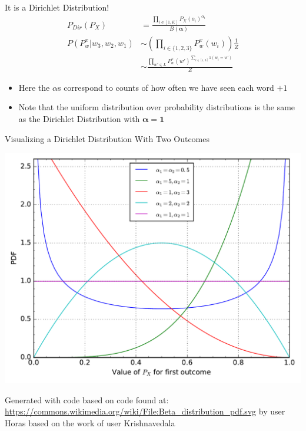 \documentclass[11pt]{beamer}
\begin{document}
	\begin{frame}{It is a Dirichlet Distribution!}
		\begin{align*}
			P_{Dir}(P_X) & = \frac{\prod_{i \in [1,K]} P_{X}(o_i)^{\alpha_i}}{B(\boldsymbol{\alpha})} \\
			P(P_{w}^x \vert w_3,w_2,w_1) & \sim \left(\prod_{i \in \{1,2,3\}} P_{w}^{x}(w_i)\right) \frac{1}{Z} \\
			& \sim \frac{\prod_{w' \in L} P_{w}^{x}(w')^{\sum_{i \in [1,3]} 1(w_i = w')}}{Z}
		\end{align*}
		
		\vspace{10pt}\begin{itemize}
			\item Here the $\alpha$s correspond to counts of how often we have seen each word $+1$
			\item Note that the uniform distribution over probability distributions is the same as the Dirichlet Distribution with $\boldsymbol{\alpha} = \boldsymbol{1}$ 
		\end{itemize}
	\end{frame}
	
	\begin{frame}{Visualizing a Dirichlet Distribution With Two Outcomes}
		\begin{center}
			\includegraphics[width=0.75\linewidth]{dirichlet_distribution_pdf}
		\end{center}
		
		\begin{tiny}
			Generated with code based on code found at: \url{https://commons.wikimedia.org/wiki/File:Beta_distribution_pdf.svg} by user Horas based on the work of user Krishnavedala
		\end{tiny}
	\end{frame}
		
\end{document}
